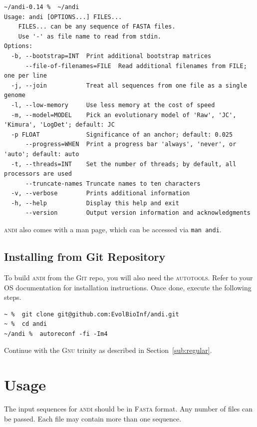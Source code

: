 \documentclass[a4paper,
  10pt,
  english,
  DIV=12,
  BCOR=8mm]{scrbook}
\newcommand{\algo}[1]{\textsc{{#1}}}
\newcommand{\andi}{\algo{andi}\xspace}
\begin{document}
\begin{lstlisting}
~/andi-0.14 %  ~/andi
Usage: andi [OPTIONS...] FILES...
	FILES... can be any sequence of FASTA files.
	Use '-' as file name to read from stdin.
Options:
  -b, --bootstrap=INT  Print additional bootstrap matrices
      --file-of-filenames=FILE  Read additional filenames from FILE; one per line
  -j, --join           Treat all sequences from one file as a single genome
  -l, --low-memory     Use less memory at the cost of speed
  -m, --model=MODEL    Pick an evolutionary model of 'Raw', 'JC', 'Kimura', 'LogDet'; default: JC
  -p FLOAT             Significance of an anchor; default: 0.025
      --progress=WHEN  Print a progress bar 'always', 'never', or 'auto'; default: auto
  -t, --threads=INT    Set the number of threads; by default, all processors are used
      --truncate-names Truncate names to ten characters
  -v, --verbose        Prints additional information
  -h, --help           Display this help and exit
      --version        Output version information and acknowledgments
\end{lstlisting}

\noindent \andi also comes with a man page, which can be accessed via \lstinline$man andi$. %

\section{Installing from Git Repository}

To build \andi from the \algo{Git} repo, you will also need the \algo{autotools}. Refer to your OS documentation for installation instructions. Once done, execute the following steps.

\begin{lstlisting}
~ %  git clone git@github.com:EvolBioInf/andi.git
~ %  cd andi
~/andi %  autoreconf -fi -Im4
\end{lstlisting}

\noindent Continue with the \algo{Gnu} trinity as described in Section~\ref{sub:regular}.


\chapter{Usage} %

The input sequences for \andi should be in \algo{Fasta} format. Any number of files can be passed. Each file may contain more than one sequence.
\end{document}
